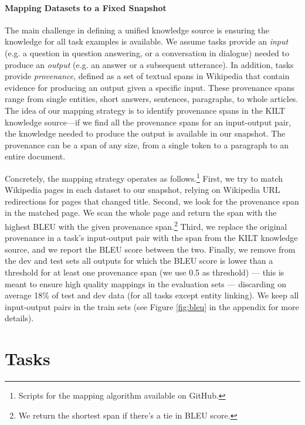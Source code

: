 \documentclass[11pt]{article}
\begin{document}
\paragraph{Mapping Datasets to a Fixed Snapshot}
\label{sec:mapping}

The main challenge in defining a unified knowledge source is ensuring the knowledge for all task examples is available. We assume tasks provide an \emph{input} (e.g. a question in question answering, or a conversation in dialogue) needed to produce an \emph{output} (e.g. an answer or a subsequent utterance). In addition, tasks provide \emph{provenance}, defined as a set of textual spans in Wikipedia that contain evidence for producing an output given a specific input. These provenance spans range from single entities, short answers, sentences, paragraphs, to whole articles. 
The idea of our mapping strategy is to identify provenance spans in the KILT knowledge source---if we find all the provenance spans for an input-output pair, the knowledge needed to produce the output is available in our snapshot. The provenance can be a span of any size, from a single token to a paragraph to an entire document.

Concretely, the mapping strategy operates as follows.\footnote{Scripts for the mapping algorithm available on GitHub.} First, we try to match Wikipedia pages in each dataset to our snapshot, relying on Wikipedia URL redirections for pages that changed title. Second, we look for the provenance span in the matched page. We scan the whole page and return the span with the highest BLEU \cite{papineni2002bleu} with the given provenance span.\footnote{We return the shortest span if there's a tie in BLEU score.} Third, we replace the original provenance in a task's input-output pair with the span from the KILT knowledge source, and we report the BLEU score between the two. Finally, we remove from the dev and test sets all outputs for which the BLEU score is lower than a threshold for at least one provenance span (we use 0.5 as threshold) --- this is meant to ensure high quality mappings in the evaluation sets --- discarding on average 18\% of test and dev data (for all tasks except entity linking). We keep all input-output pairs in the train sets (see Figure \ref{fig:bleu} in the appendix for more details).







 \section{Tasks}
\label{sec:tasks}
\end{document}
